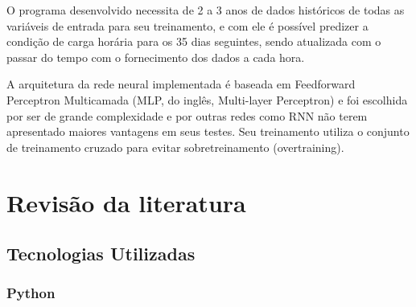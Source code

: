 \documentclass[
	12pt,				%
	oneside,			%
	a4paper,			%
	english,			%
	brazil				%
	]{abntex2}
\begin{document}
O programa desenvolvido necessita de 2 a 3 anos de dados históricos de todas as variáveis de entrada para seu treinamento, e com ele é possível predizer a condição de carga horária para os 35 dias seguintes, sendo atualizada com o passar do tempo com o fornecimento dos dados a cada hora.

A arquitetura da rede neural implementada é baseada em Feedforward Perceptron Multicamada (MLP, do inglês, Multi-layer Perceptron) e foi escolhida por ser de grande complexidade e por outras redes como RNN não terem apresentado maiores vantagens em seus testes. Seu treinamento utiliza o conjunto de treinamento cruzado para evitar sobretreinamento (overtraining). 



\chapter{Revisão da literatura}

\section{Tecnologias Utilizadas}

\subsection{Python}
\end{document}
